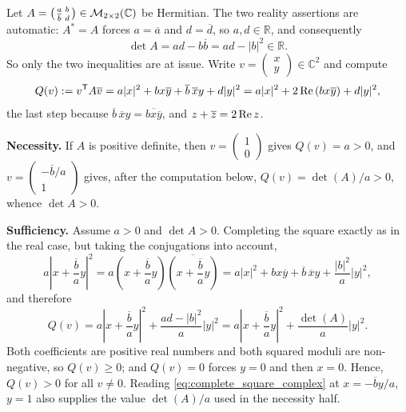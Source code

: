 \begin{exercisesolution}
\label{sol:pos_def_2x2_complex}
  Let $A = \left(\begin{smallmatrix} a & b \\ \overline{b} & d \end{smallmatrix}\right) \in \mathcal{M}_{2 \times 2}(\mathbb{C})$ be Hermitian. The two reality assertions are automatic: $A^* = A$ forces $a = \overline{a}$ and $d = \overline{d}$, so $a, d \in \mathbb{R}$, and consequently
  \[ \det A = ad - b\overline{b} = ad - |b|^2 \in \mathbb{R}. \]
  So only the two inequalities are at issue. Write $v = \left(\begin{smallmatrix} x \\ y \end{smallmatrix}\right) \in \mathbb{C}^2$ and compute
  \[ Q(v) := v^{\mathsf{T}} A \overline{v} = a|x|^2 + b x \overline{y} + \overline{b} \, \overline{x} y + d|y|^2 = a|x|^2 + 2 \operatorname{Re} \left( b x \overline{y} \right) + d |y|^2, \]
  the last step because $\overline{b}\,\overline{x}y = \overline{b x \overline{y}}$, and $z + \overline{z} = 2\operatorname{Re} z$.

  \textbf{Necessity.} If $A$ is positive definite, then $v = \left(\begin{smallmatrix} 1 \\ 0 \end{smallmatrix}\right)$ gives $Q(v) = a > 0$, and $v = \left(\begin{smallmatrix} -\overline{b}/a \\ 1 \end{smallmatrix}\right)$ gives, after the computation below, $Q(v) = \det(A)/a > 0$, whence $\det A > 0$.

  \textbf{Sufficiency.} Assume $a > 0$ and $\det A > 0$. Completing the square exactly as in the real case, but taking the conjugations into account,
  \[ a \left| x + \frac{\overline{b}}{a} y \right|^2 = a \left( x + \frac{\overline{b}}{a}y \right) \overline{\left( x + \frac{\overline{b}}{a}y \right)} = a|x|^2 + b x \overline{y} + \overline{b} \, \overline{x} y + \frac{|b|^2}{a}|y|^2, \]
  and therefore
  \begin{equation} \label{eq:complete_square_complex}
    Q(v) = a \left| x + \frac{\overline{b}}{a} y \right|^2 + \frac{ad - |b|^2}{a} |y|^2 = a \left| x + \frac{\overline{b}}{a} y \right|^2 + \frac{\det(A)}{a} |y|^2 .
  \end{equation}
  Both coefficients are positive real numbers and both squared moduli are non-negative, so $Q(v) \ge 0$; and $Q(v) = 0$ forces $y = 0$ and then $x = 0$. Hence, $Q(v) > 0$ for all $v \ne 0$. Reading \eqref{eq:complete_square_complex} at $x = -\overline{b}y/a$, $y = 1$ also supplies the value $\det(A)/a$ used in the necessity half.
\end{exercisesolution}

